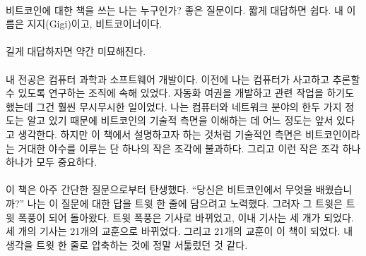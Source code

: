 \paragraph{}
비트코인에 대한 책을 쓰는 나는 누구인가? 좋은 질문이다. 
짧게 대답하면 쉽다. 내 이름은 지지(Gigi)이고, 비트코이너이다.


\paragraph{}
길게 대답하자면 약간 미묘해진다.

\paragraph{}
내 전공은 컴퓨터 과학과 소프트웨어 개발이다. 
이전에 나는 컴퓨터가 사고하고 추론할 수 있도록 연구하는 조직에 속해 있었다. 
자동화 여권을 개발하고 관련 작업을 하기도 했는데 그건 훨씬 무시무시한 일이었다. 
나는 컴퓨터와 네트워크 분야의 한두 가지 정도는 알고 있기 때문에 비트코인의 기술적 측면을 이해하는 데 어느 정도는 앞서 있다고 생각한다.
하지만 이 책에서 설명하고자 하는 것처럼 기술적인 측면은 비트코인이라는 거대한 야수를 이루는 단 하나의 작은 조각에 불과하다. 
그리고 이런 작은 조각 하나하나가 모두 중요하다. 


\paragraph{}
이 책은 아주 간단한 질문으로부터 탄생했다.  
\enquote{당신은 비트코인에서 무엇을 배웠습니까?}
나는 이 질문에 대한 답을 트윗 한 줄에 담으려고 노력했다.
그러자 그 트윗은 트윗 폭풍이 되어 돌아왔다. 트윗 폭풍은 기사로 바뀌었고, 이내 기사는 세 개가 되었다. 
세 개의 기사는 21개의 교훈으로 바뀌었다. 그리고 21개의 교훈이 이 책이 되었다. 내 생각을 트윗 한 줄로 압축하는 것에 정말 서툴렀던 것 같다.


